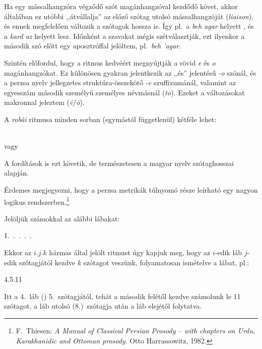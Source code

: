 Ha egy mássalhangzóra végződő szót magánhangzóval kezdődő követ, akkor
általában ez utóbbi ,,átvállalja'' az előző szótag utolsó
mássalhangzóját (\emph{liaison}), és ennek megfelelően változik a
szótagok hossza is. Így pl.~a \emph{beh agar} \metra{\m\b\m} helyett
\metra{\b\b\m}, és a \emph{kard az} \metra{\m\b\m} helyett
\metra{\m\m} lesz. Időnként a szavakat mégis szétválasztják, ezt
ilyenkor a második szó előtt egy aposztróffal jelöltem, pl.~\emph{beh
'agar}.

Szintén előfordul, hogy a ritmus kedvéért megnyújtják a rövid \emph{e}
és \emph{o} magánhangzókat. Ez különösen gyakran jelentkezik az ,,és''
jelentésű \emph{-o} szónál, és a perzsa nyelv jellegzetes
struktúra-összekötő \emph{-e} szuffixumánál, valamint az egyesszám
második személyű személyes névmásnál (\emph{to}). E\-ze\-ket a
változásokat makronnal jeleztem (\emph{ē}/\emph{ō}).

A \emph{robâi} ritmusa minden sorban (egymástól függetlenül) kétféle
lehet:
\begin{center}
  {\large\metra{\m\m\mbb\s\m\m\mbb\s\m\m\mbb\s\m\cc}}\\
  vagy\\
  {\large\metra{\m\m\mbb\s\m\b\m\b\s\m\m\mbb\s\m\cc}}
\end{center}

A fordítások is ezt követik, de természetesen a magyar nyelv
szótaghosszai alapján.

\begin{center}
\end{center}

Érdemes megjegyezni, hogy a perzsa metrikák túlnyomó része leírható
egy nagyon logikus rendszerben.\footnote{F.~Thiesen: \emph{A Manual of
    Classical Persian Prosody -- with chapters on Urdu, Karakhanidic
    and Ottoman prosody}. Otto Harrassowitz, 1982.}

Jelöljük számokkal az alábbi lábakat:
\begin{center}
  1.~\metra{\b\m\m}.~\metra{\b\m\m\m}.~\metra{\b\b\m\m}.~\metra{\b\m\b\m\b\b\m\m}.~\metra{\m\m\b\b\m\b\m\b}
\end{center}

Ekkor az $i.j.k$ hármas által jelölt ritmust úgy kapjuk meg, hogy az
$i$-edik láb $j$-edik szótagjától kezdve $k$ szótagot veszünk,
folyamatosan ismételve a lábat, pl.:
\begin{center}
4{.}5{.}11 \metra{\b\b\m\m\s\b\m\b\m\s\b\b\m}
\end{center}
Itt a 4.~láb (\metra{\b\m\b\m\b\b\m\m}) 5.~szótagjától, tehát a második felétől kezdve
számolunk le 11 szótagot, a láb utolsó (8.)~szótagja után a láb elejétől folytatva.

